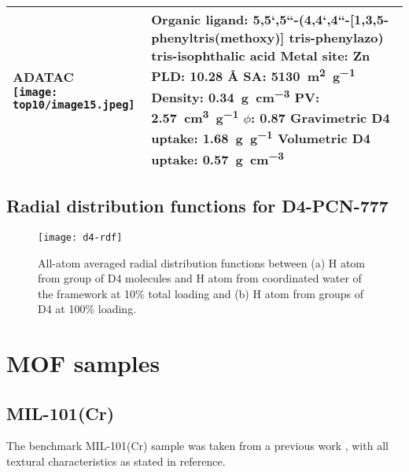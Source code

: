 {\begin{longtable}[]{@{}p{5cm}p{12cm}@{}}
    \midrule
    \makecell{\textbf{ADATAC} \\ \texttt{[image: top10/image15.jpeg]}}
    & \makecell[l]{
        \textbf{Organic ligand:} \\
        5,5`,5``-(4,4`,4``-{[}1,3,5-phenyltris(methoxy){]} tris-phenylazo) tris-isophthalic acid \\
        \textbf{Metal site:} Zn \\
        \textbf{PLD:} 10.28 Å \\
        \textbf{SA:} \SI{5130}{\metre\squared\per\gram} \\
        \textbf{Density:} \SI{0.34}{\gram\per\centi\metre\cubed} \\
        \textbf{PV:} \SI{2.57}{\centi\metre\cubed\per\gram} \\
        \textbf{\(\phi\):} 0.87 \\
        \textbf{Gravimetric D4 uptake:} \SI{1.68}{\gram\per\gram} \\
        \textbf{Volumetric D4 uptake:} \SI{0.57}{\gram\per\centi\metre\cubed}}\\
    \bottomrule
\end{longtable}
}

\subsection{Radial distribution functions for D4-PCN-777}\label{si-radial-distribution}

\begin{figure}[H]
    \centering
    \texttt{[image: d4-rdf]}
    \caption{%
        All-atom averaged radial distribution functions between (a) H atom from
         group of D4 molecules and H atom from coordinated water of the
        framework at 10\% total loading and (b) H atom from  groups of D4 at
        100\% loading.
    }\label{fig:d4-rdf}
\end{figure}

\pagebreak

\section{MOF samples}\label{mof-samples}

\subsection{MIL-101(Cr)}

The benchmark MIL-101(Cr) sample was taken from a previous work
\citep{pillaiCapturePerformancesHybrid2017}, with all textural characteristics
as stated in reference.


